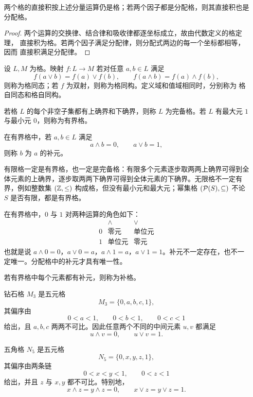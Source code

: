 \begin{theorem}[格的直接积]\label{lattice-direct-product}
  两个格的直接积按上述分量运算仍是格；若两个因子都是分配格，则其直接积也是分配格。
\end{theorem}

\begin{proof}
  两个运算的交换律、结合律和吸收律都逐坐标成立，故由代数定义的格定理，
  直接积为格。若两个因子满足分配律，则分配式两边的每一个坐标都相等，因而
  直接积满足分配律。
\end{proof}

\begin{definition}[格同态]\label{lattice-homomorphism}
  设 $L,M$ 为格。映射 $f:L\to M$ 若对任意 $a,b\in L$ 满足
  \[
  f(a\vee b)=f(a)\vee f(b),\qquad
  f(a\wedge b)=f(a)\wedge f(b),
  \]
  则称为格同态；若 $f$ 为双射，则称为格同构。定义域和值域相同时，分别称为
  格自同态和格自同构。
\end{definition}

\begin{definition}\label{complete-bounded-complement}
  若格 $L$ 的每个非空子集都有上确界和下确界，则称 $L$ 为完备格。若 $L$ 有最大元 $1$ 与最小元 $0$，则称为有界格。

  在有界格中，若 $a,b\in L$ 满足
  \[
  a\wedge b=0,\qquad a\vee b=1,
  \]
  则称 $b$ 为 $a$ 的补元。
\end{definition}

有限格一定是有界格，也一定是完备格：有限多个元素逐步取两两上确界可得到全体元素的上确界，逐步取两两下确界可得到全体元素的下确界。无限格不一定有界，例如整数集 $(\mathbb{Z},\le)$ 构成格，但没有最小元和最大元；幂集格 $(\mathcal P(S),\subseteq)$ 不论 $S$ 是否有限，都是有界格。

在有界格中，$0$ 与 $1$ 对两种运算的角色如下：
\[
\begin{array}{c|cc}
 & \wedge & \vee\\ \hline
0 & \text{零元} & \text{单位元}\\
1 & \text{单位元} & \text{零元}
\end{array}
\]
也就是说 $a\wedge0=0$，$a\vee0=a$，$a\wedge1=a$，$a\vee1=1$。补元不一定存在，也不一定唯一。分配格中的补元才具有唯一性。

\begin{definition}[补格]\label{complemented-lattice}
  若有界格中每个元素都有补元，则称为补格。
\end{definition}

\begin{definition}[钻石格与五角格]\label{diamond-pentagon}
  钻石格 $M_3$ 是五元格
  \[
  M_3=\{0,a,b,c,1\},
  \]
  其偏序由
  \[
  0<a<1,\qquad 0<b<1,\qquad 0<c<1
  \]
  给出，且 $a,b,c$ 两两不可比。因此任意两个不同的中间元素 $u,v$ 都满足
  \[
  u\wedge v=0,\qquad u\vee v=1.
  \]

  五角格 $N_5$ 是五元格
  \[
  N_5=\{0,x,y,z,1\},
  \]
  其偏序由两条链
  \[
  0<x<y<1,\qquad 0<z<1
  \]
  给出，并且 $z$ 与 $x,y$ 都不可比。特别地，
  \[
  x\wedge z=y\wedge z=0,\qquad x\vee z=y\vee z=1.
  \]
\end{definition}

